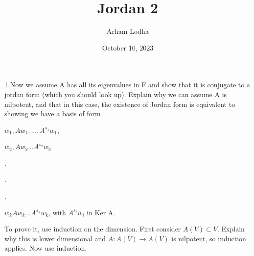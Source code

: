 \documentclass{article}
\begin{document}
\title{Jordan 2}
\author{Arham Lodha}%
\date{October 10, 2023}%
\maketitle

\begin{PROB}{1}\label{Problem 1.}
    Now we assume A has all its eigenvalues in F and show that it is conjugate to a jordan form (which you should look up). Explain why we can assume A is nilpotent, and that in this case, the existence of Jordan form is equivalent to showing we have a basis of form

$w_1, Aw_1,..., A^{s_1}w_1,$ 

$w_2, Aw_2... A^{s_2} w_2$  

.

.

.

$w_k Aw_k ... A^{s_k} w_k$, with $A^{s_i} w_i$ in Ker A. 

To prove it, use induction on the dimension. First consider $A(V) \subset V$. Explain why this is lower dimensional and $A: A(V) \to A(V)$ is nilpotent, so induction applies.   Now use induction. 
\end{PROB}
\end{document}
